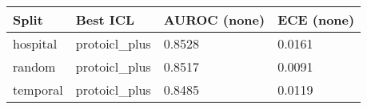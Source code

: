 \begin{tabular}{llll}
\toprule
Split & Best ICL & AUROC (none) & ECE (none) \\
\midrule
hospital & protoicl_plus & 0.8528 & 0.0161 \\
random & protoicl_plus & 0.8517 & 0.0091 \\
temporal & protoicl_plus & 0.8485 & 0.0119 \\
\bottomrule
\end{tabular}
